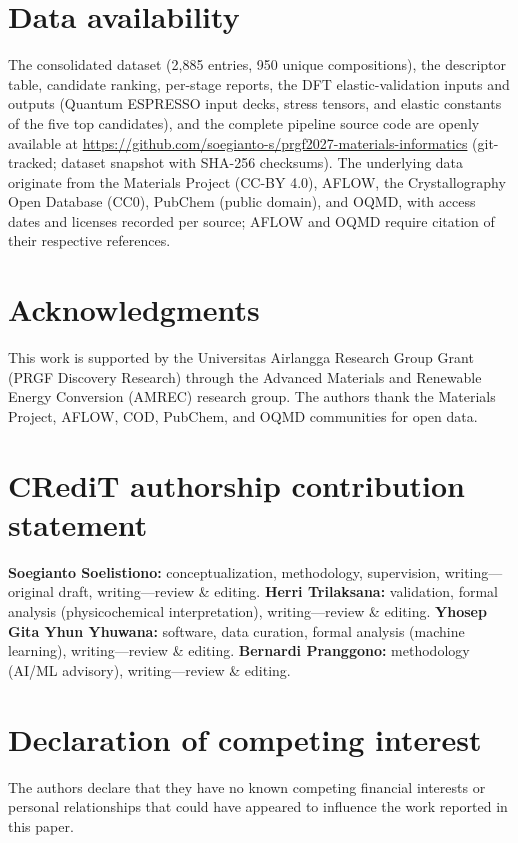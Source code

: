 \documentclass[review,11pt,a4paper]{elsarticle}
\begin{document}
\section*{Data availability}
The consolidated dataset (2{,}885 entries, 950 unique compositions), the descriptor table, candidate ranking, per-stage reports, the DFT elastic-validation inputs and outputs (Quantum ESPRESSO input decks, stress tensors, and elastic constants of the five top candidates), and the complete pipeline source code are openly available at \url{https://github.com/soegianto-s/prgf2027-materials-informatics} (git-tracked; dataset snapshot with SHA-256 checksums). The underlying data originate from the Materials Project (CC-BY 4.0), AFLOW, the Crystallography Open Database (CC0), PubChem (public domain), and OQMD, with access dates and licenses recorded per source; AFLOW and OQMD require citation of their respective references.

\section*{Acknowledgments}
This work is supported by the Universitas Airlangga Research Group Grant (PRGF Discovery Research) through the Advanced Materials and Renewable Energy Conversion (AMREC) research group. The authors thank the Materials Project, AFLOW, COD, PubChem, and OQMD communities for open data.

\section*{CRediT authorship contribution statement}
\textbf{Soegianto Soelistiono:} conceptualization, methodology, supervision, writing---original draft, writing---review \& editing. \textbf{Herri Trilaksana:} validation, formal analysis (physicochemical interpretation), writing---review \& editing. \textbf{Yhosep Gita Yhun Yhuwana:} software, data curation, formal analysis (machine learning), writing---review \& editing. \textbf{Bernardi Pranggono:} methodology (AI/ML advisory), writing---review \& editing.

\section*{Declaration of competing interest}
The authors declare that they have no known competing financial interests or personal relationships that could have appeared to influence the work reported in this paper.
\end{document}
